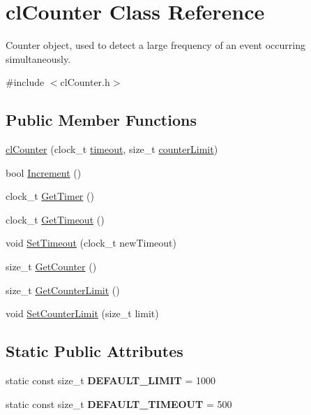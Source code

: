 \hypertarget{classcl_counter}{
\section{clCounter Class Reference}
\label{classcl_counter}
}


Counter object, used to detect a large frequency of an event occurring simultaneously.  




{\ttfamily \#include $<$clCounter.h$>$}

\subsection*{Public Member Functions}
\begin{DoxyCompactItemize}
\item 
\hyperlink{classcl_counter_a8f00e2ad134e2fc5e8227cb553ae1220}{clCounter} (clock\_\-t \hyperlink{classcl_counter_a68b6f9e1cef533810d5cfff1cdffa35a}{timeout}, size\_\-t \hyperlink{classcl_counter_aa16f1572cf9580b6c699943d678a30fc}{counterLimit})
\item 
bool \hyperlink{classcl_counter_aeb2420e725a16524177bfba91238461d}{Increment} ()
\item 
clock\_\-t \hyperlink{classcl_counter_a66a64ae6f3919d0e468eefc16541fefc}{GetTimer} ()
\item 
clock\_\-t \hyperlink{classcl_counter_a7f36a3f9fed50ecbe3f5689f13fa09c4}{GetTimeout} ()
\item 
void \hyperlink{classcl_counter_a77cc2d7cf42feab883eefb13d1eff6b7}{SetTimeout} (clock\_\-t newTimeout)
\item 
size\_\-t \hyperlink{classcl_counter_a8c7507d97558bd95ba1fd0ce564f2188}{GetCounter} ()
\item 
size\_\-t \hyperlink{classcl_counter_a506ebc846490f4b229b53e920b27a869}{GetCounterLimit} ()
\item 
void \hyperlink{classcl_counter_ac4955763f5f51f0ec171f8a7f609e35d}{SetCounterLimit} (size\_\-t limit)
\end{DoxyCompactItemize}
\subsection*{Static Public Attributes}
\begin{DoxyCompactItemize}
\item 
\hypertarget{classcl_counter_aad42294afe6fbbbe83d87d241dae5169}{
static const size\_\-t {\bfseries DEFAULT\_\-LIMIT} = 1000}
\label{classcl_counter_aad42294afe6fbbbe83d87d241dae5169}

\item 
\hypertarget{classcl_counter_a1fe8c8cc84e07f048569bedd2131cf5c}{
static const size\_\-t {\bfseries DEFAULT\_\-TIMEOUT} = 500}
\label{classcl_counter_a1fe8c8cc84e07f048569bedd2131cf5c}

\end{DoxyCompactItemize}
